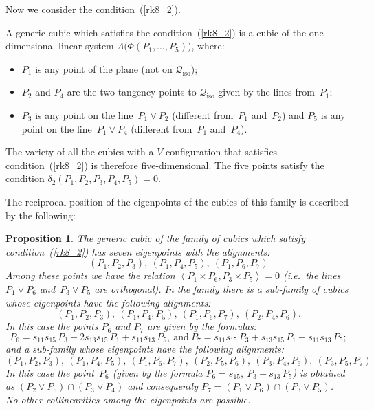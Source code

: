 \documentclass{amsart}
\theoremstyle{plain}
\newtheorem{prop}[lemma]{Proposition}
\theoremstyle{definition}
\newcommand{\iso}{\mathcal{Q}_{\mathrm{iso}}}
\newcommand{\scl}[2]{\left\langle {#1}, {#2} \right\rangle}
\begin{document}
Now we consider the condition~(\ref{rk8_2}).

%
A generic cubic which satisfies the condition~(\ref{rk8_2}) is
a cubic of the one-dimensional linear system
$\Lambda\bigl(\Phi(P_1, \dotsc, P_5)\bigr)$, where:
%
\begin{itemize}
  \item $P_1$ is any point of the plane (not on $\iso$);
  \item $P_2$ and $P_4$ are the two tangency points to $\iso$ given by the lines from~$P_1$;
  \item $P_3$ is any point on the line~$P_1 \vee P_2$ (different from~$P_1$ and~$P_2$)
  and $P_5$ is any point on the line~$P_1 \vee P_4$ (different from~$P_1$ and~$P_4$).
\end{itemize}
%
The variety of all the cubics with a $V$-configuration
that satisfies condition~(\ref{rk8_2}) is therefore five-dimensional.
The five points satisfy the condition $\delta_2(P_1, P_2, P_3, P_4, P_5) = 0$.


The reciprocal position of the eigenpoints of the cubics of this family
is described by the following:
%
\begin{prop}
\label{prop:rk8_2B}
The generic cubic of the family of cubics which satisfy condition~(\ref{rk8_2})
has seven eigenpoints with the alignments:
%
\[
  (P_1, P_2, P_3), \ (P_1, P_4, P_5), \ (P_1, P_6, P_7)
\]
%
Among these points we have the relation
$\scl{P_1 \times P_6}{P_3\times P_5}=0$
(i.e.\ the lines~$P_1 \vee P_6$ and~$P_3 \vee P_5$ are orthogonal).
In the family there is a sub-family of cubics
whose eigenpoints have the following
alignments:
%
\[
  (P_1, P_2, P_3),\ (P_1, P_4, P_5),\ (P_1, P_6, P_7),\ (P_2, P_4, P_6).
\]
%
In this case the points $P_6$ and $P_7$ are given by the formulas:
%
\[
  P_6 = s_{11}s_{15} \, P_3 - 2s_{13}s_{15} \, P_1 + s_{11}s_{13} \, P_5, \ \mbox{and} \
  P_7 = s_{11}s_{15} \, P_3 + s_{13}s_{15} \, P_1 + s_{11}s_{13} \, P_5;
\]
%
and a sub-family whose eigenpoints have the following
alignments:
%
\[
  (P_1, P_2, P_3),\ (P_1, P_4, P_5), \ 
  (P_1, P_6, P_7),\ (P_2, P_5, P_6), \ 
  (P_3, P_4, P_6),\ (P_3, P_5, P_7)
\]
%
In this case the point~$P_6$ (given by the formula
$P_6 = s_{15} ,\ P_3 + s_{13} \, P_5$) is obtained as
$(P_2 \vee P_5) \cap (P_3 \vee P_4)$ and consequently
$P_7 = (P_1 \vee P_6) \cap (P_3 \vee P_5)$.\\
No other collinearities among the eigenpoints are possible.
\end{prop}
\end{document}
